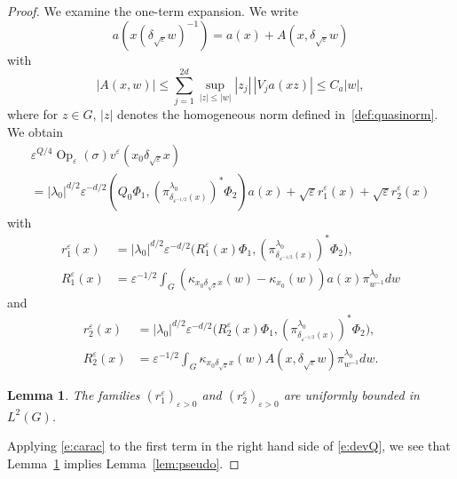 \documentclass[10pt]{amsart}
\DeclareMathOperator{\Op}{Op}
\theoremstyle{plain}
\newtheorem{lemma}[theorem]{Lemma}
\theoremstyle{definition}
\let\eps\varepsilon
\begin{document}
\begin{proof}
We examine the one-term expansion.
We write
\begin{equation} \label{e:aA}
a(x (\delta_{\sqrt\eps} w)^{-1}) = a(x) + A(x,\delta_{\sqrt\eps} w)
\end{equation}
with
\begin{equation}\label{est:Aeps}
|A (x,w)| \leq \sum_{j=1}^{2d} \sup_{|z|\leq |w|} |z_j|\, | V_j a (xz)|\leq C_a |w|,
\end{equation}
where for $z\in G$, $|z|$ denotes the homogeneous norm defined in~\eqref{def:quasinorm}.
We obtain
\begin{multline} \label{e:devQ}
\eps^{Q/4} \Op_\eps(\sigma) v^\eps(x_0\delta_{\sqrt\eps}x)\\
=
|\lambda_0|^{d/2}\eps^{-d/2} \left(Q_0 \Phi_1,
(\pi^{\lambda_0}_{\delta_{\eps^{-1/2} }(x)})^*\Phi_2\right) a(x) +\sqrt\eps r_1^\eps(x)+\sqrt\eps r_2^\eps(x)
\end{multline}
with
\begin{align*}
r_1^\eps(x)&=
|\lambda_0|^{d/2}\eps^{-d/2} \bigl(R_1^\eps(x) \Phi_1,
(\pi^{\lambda_0}_{\delta_{\eps^{-1/2} }(x)})^*\Phi_2\bigr),\\
R_1^\eps(x)&= \eps^{-1/2} \int_{G} (\kappa_{x_0\delta_{\sqrt\eps} x}(w)-\kappa_{x_0}(w)) a(x)
\pi_{ w^{-1} }^{\lambda_0} dw
\end{align*}
and
\begin{align*}
r_2^\eps(x)&=
|\lambda_0|^{d/2}\eps^{-d/2} \bigl(R_2^\eps(x) \Phi_1,
(\pi^{\lambda_0}_{\delta_{\eps^{-1/2} }(x)})^*\Phi_2\bigr),\\
R_2^\eps(x)&= \eps^{-1/2} \int_{G} \kappa_{x_0\delta_{\sqrt\eps} x}(w)
A(x, \delta_{\sqrt\eps} w)
\pi_{ w^{-1} }^{\lambda_0} dw.
\end{align*}
\begin{lemma} \label{l:unifbounded}
The families $(r_1^\eps)_{\eps>0}$ and $(r_2^\eps)_{\eps>0}$ are uniformly bounded in $L^2(G)$.
\end{lemma}
Applying \eqref{e:carac} to the first term in the right hand side of \eqref{e:devQ}, we see that Lemma~\ref{l:unifbounded} implies Lemma~\ref{lem:pseudo}.
\end{proof}
\end{document}

